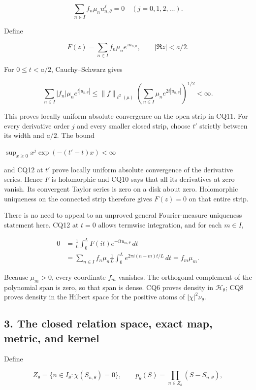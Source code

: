 \[
\sum_{n\in I}f_n\mu_nu_{n,\theta}^{j}=0
\quad(j=0,1,2,\ldots).
\tag{CQ10}
\]

Define

\[
F(z)=\sum_{n\in I}f_n\mu_ne^{zu_{n,\theta}},
\qquad |\Re z|<a/2.
\tag{CQ11}
\]

For \(0 \le t < a/2\), Cauchy--Schwarz gives

\[
\sum_{n\in I}|f_n|\mu_ne^{t|u_{n,\theta}|}
\le\|f\|_{\ell^2(\mu)}
\left(\sum_{n\in I}\mu_ne^{2t|u_{n,\theta}|}\right)^{1/2}<\infty.
\tag{CQ12}
\]

This proves locally uniform absolute convergence on the open strip in CQ11. For every derivative order \(j\) and every smaller closed strip, choose \(t'\) strictly between its width and \(a/2\). The bound

\(\sup_{x \ge 0} x^j \exp(-(t'-t)x) < \infty\)

and CQ12 at \(t'\) prove locally uniform absolute convergence of the derivative series. Hence \(F\) is holomorphic and CQ10 says that all its derivatives at zero vanish. Its convergent Taylor series is zero on a disk about zero. Holomorphic uniqueness on the connected strip therefore gives \(F(z)=0\) on that entire strip.

There is no need to appeal to an unproved general Fourier-measure uniqueness statement here. CQ12 at \(t=0\) allows termwise integration, and for each \(m \in I\),

\[
\begin{aligned}
0&=\frac1L\int_0^L F(it)e^{-it u_{m,\theta}}\,dt\\
&=\sum_{n\in I}f_n\mu_n
\frac1L\int_0^L e^{2\pi i(n-m)t/L}\,dt
=f_m\mu_m.
\end{aligned}
\tag{CQ13}
\]

Because \(\mu_m>0\), every coordinate \(f_m\) vanishes. The orthogonal complement of the polynomial span is zero, so that span is dense. CQ6 proves density in \(\mathcal H_\theta\); CQ8 proves density in the Hilbert space for the positive atoms of \(|\chi|^2 \nu_\theta\).

\subsection{3. The closed relation space, exact map, metric, and kernel}\label{the-closed-relation-space-exact-map-metric-and-kernel}

Define

\[
Z_\theta=\{n\in I_\theta:\chi(S_{n,\theta})=0\},\qquad
p_\theta(S)=\prod_{n\in Z_\theta}(S-S_{n,\theta}),
\tag{CQ14}
\]

